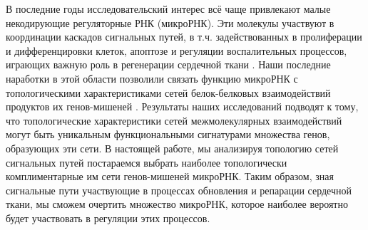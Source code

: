 В последние годы исследовательский интерес всё чаще привлекают малые некодирующие регуляторные РНК (микроРНК). Эти молекулы участвуют в координации каскадов сигнальных путей, в т.ч. задействованных в пролиферации и дифференцировки клеток, апоптозе и регуляции воспалительных процессов, играющих важную роль в регенерации сердечной ткани \cite{wang2021myocardial, wang2021non}. Наши последние наработки в этой области позволили связать функцию микроРНК с топологическими характеристиками сетей белок-белковых взаимодействий продуктов их генов-мишеней \cite{osmak2020mirna,osmak2024MolBiol,pisklova2024unveiling}. Результаты наших исследований подводят к тому, что топологические характеристики сетей межмолекулярных взаимодействий могут быть уникальным функциональными сигнатурами множества генов, образующих эти сети. В настоящей работе, мы анализируя топологию сетей сигнальных путей постараемся выбрать наиболее топологически комплиментарные им сети генов-мишеней микроРНК. Таким образом, зная сигнальные пути участвующие в процессах обновления и репарации сердечной ткани, мы сможем очертить множество микроРНК, которое наиболее вероятно будет участвовать в регуляции этих процессов.